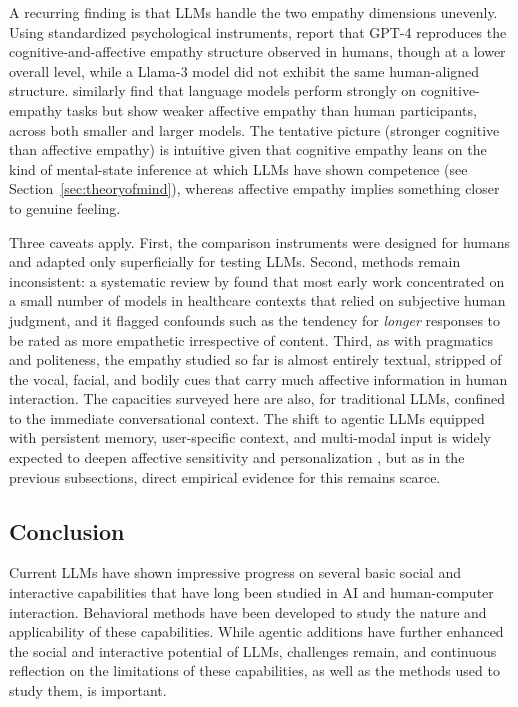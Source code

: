 A recurring finding is that LLMs handle the two empathy dimensions unevenly. Using standardized psychological instruments, \citet{yu2025can} report that GPT-4 reproduces the cognitive-and-affective empathy structure observed in humans, though at a lower overall level, while a Llama-3 model did not exhibit the same human-aligned structure. \citet{williams2025heartificial} similarly find that language models perform strongly on cognitive-empathy tasks but show weaker affective empathy than human participants, across both smaller and larger models. The tentative picture (stronger cognitive than affective empathy) is intuitive given that cognitive empathy leans on the kind of mental-state inference at which LLMs have shown %
competence (see Section~\ref{sec:theoryofmind}), whereas affective empathy implies %
something closer to genuine feeling. 

Three caveats apply. First, the comparison instruments were designed for humans and adapted only superficially for testing LLMs. Second, methods remain inconsistent: a systematic review by \citet{sorin2024large} found that most early work concentrated on a small number of models in healthcare contexts that relied on subjective human judgment, and it flagged confounds such as the tendency for \emph{longer} responses to be rated as more empathetic irrespective of content. Third, as with pragmatics and politeness, the empathy studied so far is almost entirely textual, stripped of the vocal, facial, and bodily cues that carry much affective information in human interaction. The capacities surveyed here are also, for traditional LLMs, confined to the immediate conversational context. The shift to agentic LLMs equipped with persistent memory, user-specific context, and multi-modal input is widely expected to deepen affective sensitivity and personalization \citep{sravanthi2024-pub}, but as in the previous subsections, direct empirical evidence for this remains scarce.

\subsection{Conclusion}
Current LLMs have shown impressive progress on several basic social and interactive capabilities that have long been studied in AI and human-computer interaction. Behavioral methods have been developed to study the nature and applicability of these capabilities. While agentic additions have further enhanced the social and interactive potential of LLMs, challenges remain, and continuous reflection on the limitations of these capabilities, as well as the methods used to study them, is important.


